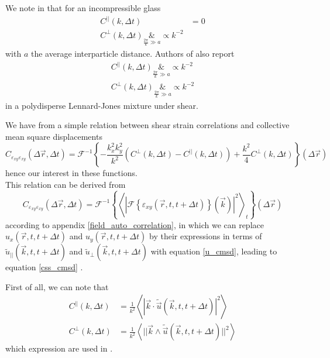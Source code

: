 \documentclass[class=report, float=false, crop=false]{standalone}
\begin{document}
We note in \cite{illing2016strain} that for an incompressible glass
\begin{equation}
\begin{aligned}
C^{||}(k, \Delta t) &= 0\\
C^{\perp}(k, \Delta t) \underset{\frac{2\pi}{k} \gg a}&{\propto} k^{-2}
\end{aligned}
\end{equation}
with $a$ the average interparticle distance. Authors of \cite{leonforte2005continuum} also report
\begin{equation}
\begin{aligned}
C^{||}(k, \Delta t) \underset{\frac{2\pi}{k} \gg a}&{\propto} k^{-2}\\
C^{\perp}(k, \Delta t) \underset{\frac{2\pi}{k} \gg a}&{\propto} k^{-2}
\end{aligned}
\end{equation}
in a polydisperse Lennard-Jones mixture under shear.


We have from \cite{illing2016strain} a simple relation between shear strain correlations and collective mean square displacements
\begin{equation}
C_{\varepsilon_{xy}\varepsilon_{xy}}(\Delta \vec{r}, \Delta t) = \mathcal{F}^{-1}\left\{-\frac{k_x^2k_y^2}{k^2}\left(C^{\perp}(k, \Delta t) - C^{||}(k, \Delta t)\right) + \frac{k^2}{4}C^{\perp}(k, \Delta t)\right\}(\Delta \vec{r})
\label{css_cmsd}
\end{equation}
hence our interest in these functions.\\

This relation can be derived from
\begin{equation}
C_{\varepsilon_{xy}\varepsilon_{xy}}(\Delta \vec{r}, \Delta t) = \mathcal{F}^{-1}\left\{\left<|\mathcal{F}\left\{\varepsilon_{xy}(\vec{r}, t, t + \Delta t)\right\}(\vec{k})|^2\right>_t\right\}(\Delta \vec{r})
\label{css_from_ft}
\end{equation}
according to appendix \ref{field_auto_correlation}, in which we can replace $u_x(\vec{r}, t, t + \Delta t)$ and $u_y(\vec{r}, t, t + \Delta t)$ by their expressions in terms of $\tilde{u}_{||}(\vec{k}, t, t + \Delta t)$ and $\tilde{u}_{\perp}(\vec{k}, t, t + \Delta t)$ with equation \ref{u_cmsd}, leading to equation \ref{css_cmsd} \cite{stackexchange}.


First of all, we can note that
\begin{equation}
\begin{aligned}
C^{||}(k, \Delta t) &= \frac{1}{k^2}\left<|\vec{k}\cdot\tilde{\vec{u}}(\vec{k}, t, t + \Delta t)|^2\right>\\
C^{\perp}(k, \Delta t) &= \frac{1}{k^2}\left<||\vec{k}\wedge\tilde{\vec{u}}(\vec{k}, t, t + \Delta t)||^2\right>
\end{aligned}
\label{cmsd_k}
\end{equation}
which expression are used in \cite{leonforte2005continuum}.\\
\end{document}
